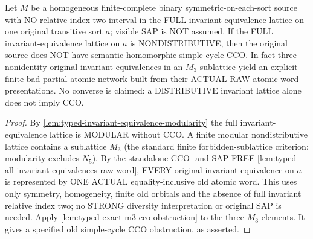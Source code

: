 \begin{corollary}
\label{cor:typed-terminal-nondistributive-noncco}
Let $M$ be a homogeneous finite-complete
binary symmetric-on-each-sort source with
NO relative-index-two interval in the FULL
invariant-equivalence lattice on one original
transitive sort $a$; visible SAP is NOT assumed.
If the FULL invariant-equivalence lattice
on $a$ is NONDISTRIBUTIVE, then the
original source does NOT have semantic
homomorphic simple-cycle CCO.
In fact three nonidentity original
invariant equivalences in an $M_3$
sublattice yield an explicit finite
bad partial atomic network built from
their ACTUAL RAW atomic word presentations.
No converse is claimed:
a DISTRIBUTIVE invariant lattice
alone does not imply CCO.
\end{corollary}
\begin{proof}
By \cref{lem:typed-invariant-equivalence-modularity}
the full invariant-equivalence lattice
is MODULAR without CCO.  A finite
modular nondistributive lattice
contains a sublattice $M_3$ (the
standard finite forbidden-sublattice
criterion: modularity excludes $N_5$).
By the standalone CCO- and SAP-FREE
\cref{lem:typed-all-invariant-equivalences-raw-word},
EVERY original invariant equivalence
on $a$ is represented by ONE ACTUAL
equality-inclusive old atomic word.
This uses only symmetry, homogeneity,
finite old orbitals and the absence
of full invariant relative index two;
no STRONG diversity interpretation
or original SAP is needed.
Apply
\cref{lem:typed-exact-m3-cco-obstruction}
to the three $M_3$ elements.
It gives a specified old simple-cycle
CCO obstruction, as asserted.
\end{proof}





